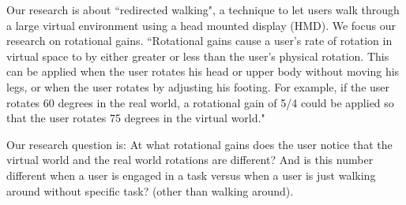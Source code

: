 Our research is about ``redirected walking", a technique to let users walk through a large virtual environment using a head mounted display (HMD).
We focus our research on rotational gains.
``Rotational gains cause a user's rate of rotation in virtual space to by either greater or less than 
the user's physical rotation. This can be applied when the user rotates his head or upper body 
without moving his legs, or when the user rotates by adjusting his footing. For example, if the 
user rotates 60 degrees in the real world, a rotational gain of 5/4 could be applied so that the 
user rotates 75 degrees in the virtual world."\cite{jwalker}

Our research question is: At what rotational gains does the user notice that the virtual world and the real world rotations are different? And is this number different when a user is engaged in a task versus when a user is just walking around without specific task? (other than walking around).
